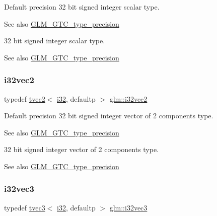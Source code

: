 Default precision 32 bit signed integer scalar type. \begin{DoxySeeAlso}{See also}
\hyperlink{group__gtc__type__precision}{G\+L\+M\+\_\+\+G\+T\+C\+\_\+type\+\_\+precision}
\end{DoxySeeAlso}
32 bit signed integer scalar type. \begin{DoxySeeAlso}{See also}
\hyperlink{group__gtc__type__precision}{G\+L\+M\+\_\+\+G\+T\+C\+\_\+type\+\_\+precision} 
\end{DoxySeeAlso}
\mbox{\label{group__gtc__type__precision_ga25820e641988fe33b075d80434872d02}} 
\subsubsection{\texorpdfstring{i32vec2}{i32vec2}}
{\footnotesize\ttfamily typedef \hyperlink{structglm_1_1tvec2}{tvec2}$<$ \hyperlink{group__gtc__type__precision_ga1d8ed5c43e91ea7d4528389da4fa9524}{i32}, defaultp $>$ \hyperlink{group__gtc__type__precision_ga25820e641988fe33b075d80434872d02}{glm\+::i32vec2}}

Default precision 32 bit signed integer vector of 2 components type. \begin{DoxySeeAlso}{See also}
\hyperlink{group__gtc__type__precision}{G\+L\+M\+\_\+\+G\+T\+C\+\_\+type\+\_\+precision}
\end{DoxySeeAlso}
32 bit signed integer vector of 2 components type. \begin{DoxySeeAlso}{See also}
\hyperlink{group__gtc__type__precision}{G\+L\+M\+\_\+\+G\+T\+C\+\_\+type\+\_\+precision} 
\end{DoxySeeAlso}
\mbox{\label{group__gtc__type__precision_gab67e08f6a4b1bce82a9a34ecb2bfba64}} 
\subsubsection{\texorpdfstring{i32vec3}{i32vec3}}
{\footnotesize\ttfamily typedef \hyperlink{structglm_1_1tvec3}{tvec3}$<$ \hyperlink{group__gtc__type__precision_ga1d8ed5c43e91ea7d4528389da4fa9524}{i32}, defaultp $>$ \hyperlink{group__gtc__type__precision_gab67e08f6a4b1bce82a9a34ecb2bfba64}{glm\+::i32vec3}}

